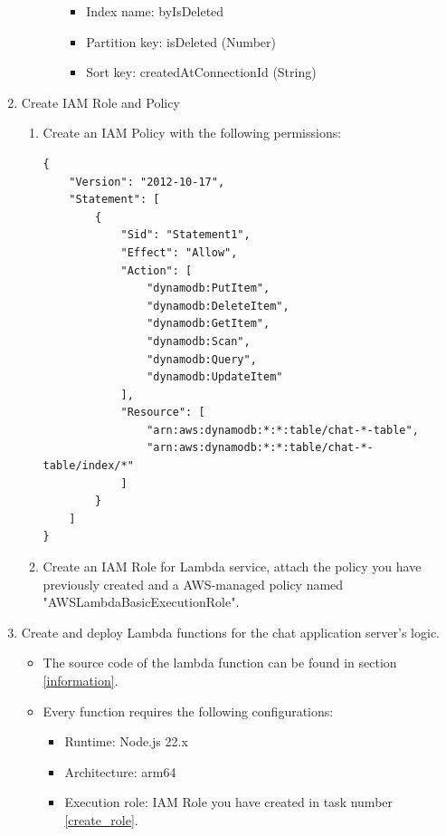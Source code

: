 \documentclass{article}
\begin{document}
\begin{enumerate}
\begin{enumerate}
\begin{itemize}
      \begin{itemize}
        \item Index name: byIsDeleted
        \item Partition key: isDeleted (Number)
        \item Sort key: createdAtConnectionId (String)
      \end{itemize}
    \end{itemize}
  \end{enumerate}
\item \label{create_role} Create IAM Role and Policy
  \begin{enumerate}
    \item Create an IAM Policy with the following permissions:
    \begin{verbatim}
{
    "Version": "2012-10-17",
    "Statement": [
        {
            "Sid": "Statement1",
            "Effect": "Allow",
            "Action": [
                "dynamodb:PutItem",
                "dynamodb:DeleteItem",
                "dynamodb:GetItem",
                "dynamodb:Scan",
                "dynamodb:Query",
                "dynamodb:UpdateItem"
            ],
            "Resource": [
                "arn:aws:dynamodb:*:*:table/chat-*-table",
                "arn:aws:dynamodb:*:*:table/chat-*-table/index/*"
            ]
        }
    ]
}
    \end{verbatim}
    \item Create an IAM Role for Lambda service, attach the policy you have previously created and a AWS-managed policy named "AWSLambdaBasicExecutionRole".
  \end{enumerate}
\item \label{create_function} Create and deploy Lambda functions for the chat application server's logic.
  \begin{itemize}
    \item The source code of the lambda function can be found in section \ref{information}.
    \item Every function requires the following configurations:
    \begin{itemize}
      \item Runtime: Node.js 22.x
      \item Architecture: arm64
      \item Execution role: IAM Role you have created in task number \ref{create_role}.
    \end{itemize}
  \end{itemize}
  \begin{enumerate}

\end{enumerate}
\end{enumerate}
\end{document}
